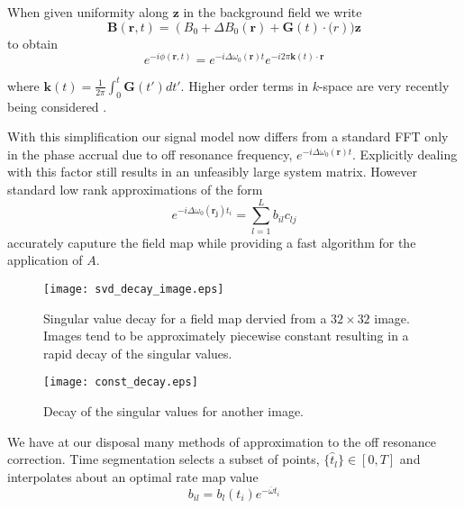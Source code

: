 \documentclass[11pt]{amsart}
\theoremstyle{remark}
\begin{document}
When given uniformity along $\mathbf{z}$ in the background field we write
\begin{equation}
\mathbf{B}(\mathbf{r},t) = (B_0 + \Delta B_0(\mathbf{r}) + \mathbf{G}(t)\cdot \mathbf(r))\mathbf{z}
\end{equation}
to obtain
\begin{equation}
e^{-i\phi(\mathbf{r},t)} = e^{-i\Delta \omega_0(\mathbf{r})t}e^{-i2\pi \mathbf{k}(t)\cdot \mathbf{r}}
\end{equation}

where $\mathbf{k}(t) = \frac{1}{2\pi}\int_0^t \mathbf{G}(t')dt'$. Higher
order terms in $k$-space are very recently being considered \cite{Wilm2011}.

With this simplification our signal model now differs from a standard
FFT only in the phase accrual due to off resonance frequency,
$e^{-i\Delta \omega_0(\mathbf{r})t}$. Explicitly dealing with this
factor
still results in an unfeasibly large system matrix. However standard low rank approximations of the form
\begin{equation}
e^{-i\Delta \omega_0(\mathbf{r_j})t_i} = \sum_{l=1}^L b_{il}c_{lj}
\end{equation}
accurately caputure the field map while providing a fast algorithm for
the application of $A$.

\begin{center}
\begin{figure}
\texttt{[image: svd\_decay\_image.eps]}
\caption{Singular value decay for a field map dervied from a $32\times 32$ image. Images tend to be approximately piecewise constant resulting in a rapid decay of the singular values.}
\end{figure}
\end{center}


\begin{center}
\begin{figure}
\texttt{[image: const\_decay.eps]}
\caption{Decay of the singular values for another image.}
\end{figure}
\end{center}

We have at our disposal many methods of approximation to the off
resonance correction. Time segmentation \cite{Sutton2003} selects a subset of points, $\{ \hat{t}_l \} \in [0,T]$ and interpolates about an optimal rate map value
\begin{equation}
b_{il} = b_l(t_i)e^{-\overline{\omega}t_i}
\end{equation}
\end{document}
